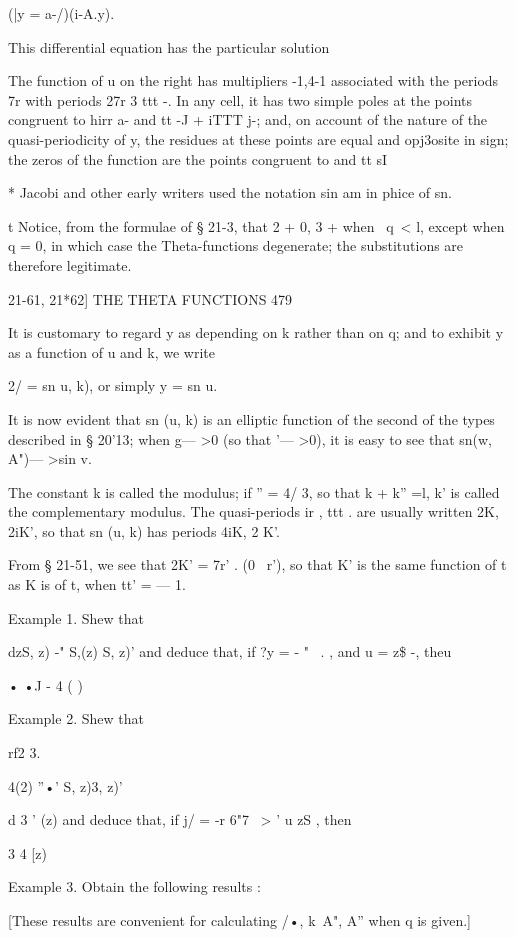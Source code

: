 (|y = a-/)(i-A.y).

This differential equation has the particular solution

The function of u on the right has multipliers -1,4-1 associated with
the periods 7r%
with periods 27r 3 ttt -. In any cell, it has two simple poles at the
points congruent to hirr a- and tt -J + iTTT j-; and, on account of
the nature of the quasi-periodicity of y, the residues at these points
are equal and opj3osite in sign; the zeros of the function are the
points congruent to and tt sI

* Jacobi and other early writers used the notation sin am in phice of
sn.

t Notice, from the formulae of § 21-3, that 2 + 0, 3 + when \ q\ < l,
except when q = 0, in which case the Theta-functions degenerate; the
substitutions are therefore legitimate.

21-61, 21*62] THE THETA FUNCTIONS 479

It is customary to regard y as depending on k rather than on q; and
to exhibit y as a function of u and k, we write

2/ = sn u, k), or simply y = sn u.

It is now evident that sn (u, k) is an elliptic function of the second
of the types described in § 20'13; when g— >0 (so that '— >0), it is
easy to see that sn(w, A")— >sin v.

The constant k is called the modulus; if '' = 4/ 3, so that k + k''
=l, k' is called the complementary modulus. The quasi-periods ir , ttt
. are usually written 2K, 2iK', so that sn (u, k) has periods 4iK, 2
K'.

From § 21-51, we see that 2K' = 7r' . (0 \ r'), so that K' is the same
function of t as K is of t, when tt' = — 1.

Example 1. Shew that

dzS, z) -" S,(z) S, z)' and deduce that, if ?y = - " ~. , and u = z\$
-, theu

• •J - 4 ( )

Example 2. Shew that

rf2 3.

4(2) ''•' S, z)3, z)'

d 3 ' (z) and deduce that, if j/ = -r 6"7 \ > ' u zS , then

 3 4 [z)

Example 3. Obtain the following results :

[These results are convenient for calculating /•, k\ A", A'' when q is
given.]

